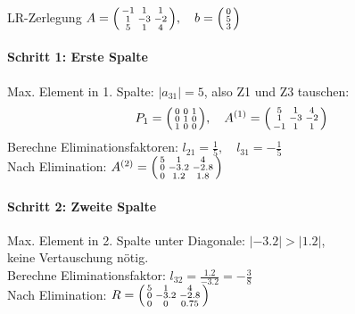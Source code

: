 \begin{example2}[breakable]{LR-Zerlegung}
$A = \begin{psmallmatrix}
-1 & 1 & 1\\
1 & -3 & -2\\
5 & 1 & 4
\end{psmallmatrix}, \quad b = \begin{psmallmatrix}
0\\
5\\
3
\end{psmallmatrix}$

\paragraph{Schritt 1: Erste Spalte}
Max. Element in 1. Spalte: $|a_{31}| = 5$, also Z1 und Z3 tauschen:
$$P_1 = \begin{psmallmatrix}
0 & 0 & 1\\
0 & 1 & 0\\
1 & 0 & 0
\end{psmallmatrix}, \quad A^{(1)} = \begin{psmallmatrix}
5 & 1 & 4\\
1 & -3 & -2\\
-1 & 1 & 1
\end{psmallmatrix}$$
Berechne Eliminationsfaktoren:
$l_{21} = \frac{1}{5}, \quad l_{31} = -\frac{1}{5}$
\vspace{2mm}\\
Nach Elimination:
$A^{(2)} = \begin{psmallmatrix}
5 & 1 & 4\\
0 & -3.2 & -2.8\\
0 & 1.2 & 1.8
\end{psmallmatrix}$

\paragraph{Schritt 2: Zweite Spalte}
Max. Element in 2. Spalte unter Diagonale: $|-3.2| > |1.2|$, \\ keine Vertauschung nötig.
\vspace{2mm}\\
Berechne Eliminationsfaktor:
$l_{32} = \frac{1.2}{-3.2} = -\frac{3}{8}$
\vspace{2mm}\\
Nach Elimination:
$R = \begin{psmallmatrix}
5 & 1 & 4\\
0 & -3.2 & -2.8\\
0 & 0 & 0.75
\end{psmallmatrix}$


\end{example2}

